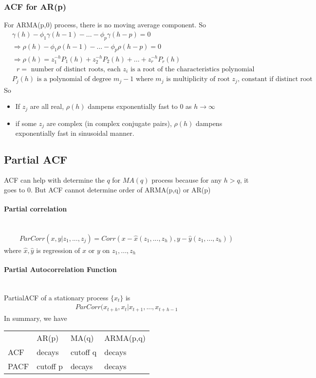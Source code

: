 \subsubsection{ACF for AR(p)} 
For ARMA(p,0) process, there is no moving average component. So 
    \begin{align*}
        & \gamma(h) - \phi_1 \gamma(h-1) - ... - \phi_p \gamma(h-p) = 0 \\
        & \Longrightarrow \rho(h) - \phi_1 \rho(h-1) - ... - \phi_p \rho(h-p) = 0 \\
        & \Longrightarrow \rho(h) = z_1^{-h}P_1(h) + z_2^{-h}P_2(h) + ... + z_r^{-h}P_r(h) \\
        & \textrm{ $r=$ number of distinct roots, each $z_i$ is a root of the characteristics polynomial} \\
        & \textrm{$P_j(h)$ is a polynomial of degree $m_j - 1$ where $m_j$ is multiplicity of root $z_j$, constant if distinct root} 
    \end{align*}
So 
    \begin{itemize}
        \item If $z_j$ are all real, $\rho(h)$ dampens exponentially fast to 0 as $h \to \infty $
        \item if some $z_j$ are complex (in complex conjugate pairs), $\rho(h)$ dampens exponentially  fast in sinusoidal manner. 
    \end{itemize}
    
\subsection{Partial ACF}
ACF can help with determine the $q$ for $MA(q)$ process because for any $h > q$, it goes to 0. But ACF cannot determine order of ARMA(p,q) or AR(p)

\paragraph{Partial correlation}\mbox{}\\
\begin{align*}
    ParCorr(x,y|z_1,...,z_j) = Corr(x - \hat{x}(z_1,...,z_h), y - \hat{y}(z_1,...,z_h))
\end{align*}
where $\hat{x}, \hat{y}$ is regression of $x$ or $y$ on $z_1,...,z_h$

\paragraph{Partial Autocorrelation Function} \mbox{}\\
PartialACF of a stationary process $\{ x_t \}$ is 
\begin{align*}
    ParCorr(x_{t+h}, x_t | x_{t+1}, ..., x_{t+h-1}
\end{align*}
In summary, we have 

\begin{table}[h]
\centering
\begin{tabular}{llll}
     & AR(p)    & MA(q)    & ARMA(p,q)  \\
ACF  & decays   & cutoff q & decays     \\
PACF & cutoff p & decays   & decays     \\
\end{tabular}
\end{table}

